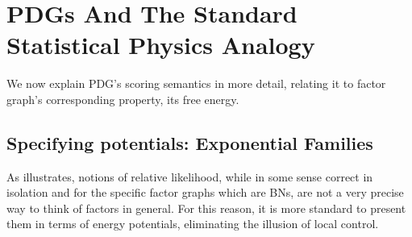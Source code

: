 \documentclass{article}
\theoremstyle{plain}
\theoremstyle{definition}
\theoremstyle{remark}
\newcommand\mat[1]{\mathbf{#1}}
\newcommand{\commentout}[1]{\ignorespaces}
\newcommand{\bp}[1][L]{\mat{p}_{\!_{#1}\!}}
\newcommand{\dg}[1]{\mathfrak{#1}}
\newcommand{\PDGof}[1]{\dg G(#1)}
\numberwithin{equation}{section}
\begin{document}
\commentout{
	\begin{proof}
		Because each local normalization results in a local joint
				distribution $\bp[J] = \frac{1}{Z_J}
				\phi_J$ on the variables associated with $J$, and these distributions differ from the original factors $\phi_J$ by only a multiplicative 
			   constant, the product of these locally normalized factors differs from the product of the factors by only a constant, and so 
		\[ \Pr\nolimits_F(\vec x) \propto \prod_{J \in \cal J} \phi_J(\vec x) \propto \prod_{J \in \cal J} \left(\frac{\phi_J(\vec x)}{Z_J}\right) \propto \Pr_{\Phi(\PDGof{F})}(\vec x) \]
		and since the two distributions are normalized, they must be equal.
	\end{proof}
}

	\section{PDGs And The Standard Statistical Physics Analogy}
	We now explain PDG's scoring semantics in more detail, relating it to factor graph's corresponding property, its free energy.
	
	\subsection{Specifying potentials: Exponential
          Families}\label{sec:fg-expfam}

	As  illustrates, notions of relative likelihood, while in some sense correct in isolation and for the specific factor graphs which are BNs, are not a very precise way to think of factors in general. 
	For this reason, it is more standard to present them in terms of energy potentials, eliminating the illusion of local control. 
	
\end{document}
